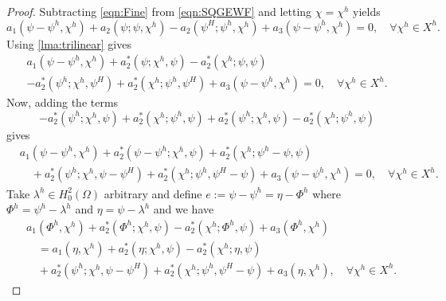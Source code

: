 \begin{proof}
  Subtracting \eqref{eqn:Fine} from \eqref{eqn:SQGEWF} and letting $\chi=\chi^h$ yields
  \begin{equation*}
    a_1(\psi - \psi^h,\chi^h) + a_2(\psi;\psi,\chi^h) - a_2(\psi^H;\psi^h,\chi^h)  
      + a_3(\psi-\psi^h,\chi^h) = 0, \quad \forall \chi^h \in X^h.
  \end{equation*}
  Using \autoref{lma:trilinear} gives
  \begin{equation*}
    \begin{split}
      a_1(\psi - \psi^h,\chi^h) 
        + a_2^*(\psi;\chi^h, \psi) - a_2^*(\chi^h;\psi,\psi) \\ 
      - a_2^*(\psi^h;\chi^h,\psi^H) + a_2^*(\chi^h; \psi^h,\psi^H)  
        + a_3(\psi-\psi^h,\chi^h) = 0, \quad \forall \chi^h \in X^h.
    \end{split}
  \end{equation*}
  Now, adding the terms
  \begin{equation*}
    -a_2^*(\psi^h;\chi^h,\psi) + a_2^*(\chi^h;\psi^h,\psi) + a_2^*(\psi^h;\chi^h,\psi) - a_2^*(\chi^h;\psi^h,\psi)
  \end{equation*}
  gives
  \begin{equation*}
    \begin{split}
      &a_1(\psi - \psi^h,\chi^h) 
        + a_2^*(\psi-\psi^h;\chi^h, \psi) + a_2^*(\chi^h;\psi^h-\psi,\psi) \\ 
      &\quad+ a_2^*(\psi^h;\chi^h,\psi-\psi^H) + a_2^*(\chi^h; \psi^h,\psi^H-\psi)  
        + a_3(\psi-\psi^h,\chi^h) = 0, \quad \forall \chi^h \in X^h.
    \end{split}
  \end{equation*}
  Take $\lambda^h\in H^2_0(\Omega)$ arbitrary and define $e:= \psi - \psi^h = \eta - \Phi^h$ where
  $\Phi^h = \psi^h-\lambda^h$ and $\eta=\psi-\lambda^h$ and we have
  \begin{equation*}
    \begin{split}
      &a_1(\Phi^h,\chi^h) 
        + a_2^*(\Phi^h;\chi^h, \psi) - a_2^*(\chi^h;\Phi^h,\psi) 
        + a_3(\Phi^h,\chi^h) \\
      &\quad = a_1(\eta,\chi^h) 
        + a_2^*(\eta;\chi^h, \psi) - a_2^*(\chi^h;\eta,\psi) \\ 
      &\quad+ a_2^*(\psi^h;\chi^h,\psi-\psi^H) + a_2^*(\chi^h; \psi^h,\psi^H-\psi)  
        + a_3(\eta,\chi^h), \quad \forall \chi^h \in X^h.
    \end{split}
  \end{equation*}

\end{proof}
